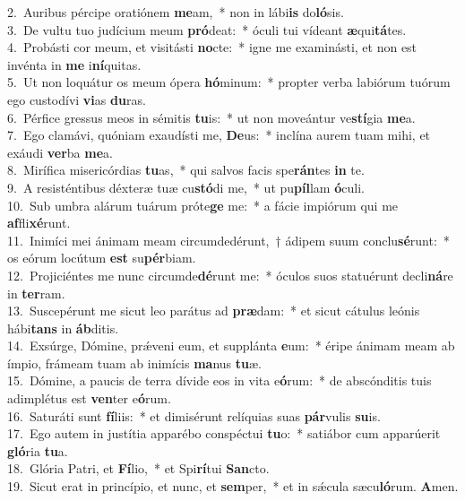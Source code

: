 {2.~}Auribus pércipe oratiónem \textbf{me}am,~* non in lábi\textbf{is} do\textbf{ló}sis.\\
{3.~}De vultu tuo judícium meum \textbf{pró}deat:~* óculi tui vídeant \textbf{æ}qui\textbf{tá}tes.\\
{4.~}Probásti cor meum, et visitásti \textbf{no}cte:~* igne me examinásti, et non est invénta in \textbf{me} i\textbf{ní}quitas.\\
{5.~}Ut non loquátur os meum ópera \textbf{hó}minum:~* propter verba labiórum tuórum ego custodívi \textbf{vi}as \textbf{du}ras.\\
{6.~}Pérfice gressus meos in sémitis \textbf{tu}is:~* ut non moveántur ve\textbf{stí}gia \textbf{me}a.\\
{7.~}Ego clamávi, quóniam exaudísti me, \textbf{De}us:~* inclína aurem tuam mihi, et exáudi \textbf{ver}ba \textbf{me}a.\\
{8.~}Mirífica misericórdias \textbf{tu}as,~* qui salvos facis spe\textbf{rán}tes \textbf{in} te.\\
{9.~}A resisténtibus déxteræ tuæ cu\textbf{stó}di me,~* ut pu\textbf{píl}lam \textbf{ó}culi.\\
{10.~}Sub umbra alárum tuárum próte\textbf{ge} me:~* a fácie impiórum qui me \textbf{af}fli\textbf{xé}runt.\\
{11.~}Inimíci mei ánimam meam circumdedérunt,~† ádipem suum conclu\textbf{sé}runt:~* os eórum locútum \textbf{est} su\textbf{pér}biam.\\
{12.~}Projiciéntes me nunc circumde\textbf{dé}runt me:~* óculos suos statuérunt decli\textbf{ná}re in \textbf{ter}ram.\\
{13.~}Suscepérunt me sicut leo parátus ad \textbf{præ}dam:~* et sicut cátulus leónis hábi\textbf{tans} in \textbf{áb}ditis.\\
{14.~}Exsúrge, Dómine, prǽveni eum, et supplánta \textbf{e}um:~* éripe ánimam meam ab ímpio, frámeam tuam ab inimícis \textbf{ma}nus \textbf{tu}æ.\\
{15.~}Dómine, a paucis de terra dívide eos in vita e\textbf{ó}rum:~* de abscónditis tuis adimplétus est \textbf{ven}ter e\textbf{ó}rum.\\
{16.~}Saturáti sunt \textbf{fí}liis:~* et dimisérunt relíquias suas \textbf{pár}vulis \textbf{su}is.\\
{17.~}Ego autem in justítia apparébo conspéctui \textbf{tu}o:~* satiábor cum apparúerit \textbf{gló}ria \textbf{tu}a.\\
{18.~}Glória Patri, et \textbf{Fí}lio,~* et Spi\textbf{rí}tui \textbf{San}cto.\\
{19.~}Sicut erat in princípio, et nunc, et \textbf{sem}per,~* et in sǽcula sæcu\textbf{ló}rum. \textbf{A}men.\\

